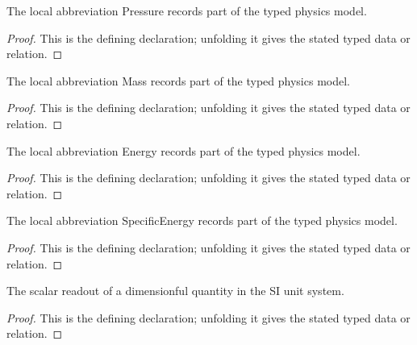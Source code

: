 \begin{definition}[Pressure]
  \label{decl:physics:IPhO_2026_4_B_6:Pressure}
  The local abbreviation Pressure records part of the typed physics model.
\end{definition}
\begin{proof}
  This is the defining declaration; unfolding it gives the stated typed data or relation.
\end{proof}

\begin{definition}[Mass]
  \label{decl:physics:IPhO_2026_4_B_6:Mass}
  The local abbreviation Mass records part of the typed physics model.
\end{definition}
\begin{proof}
  This is the defining declaration; unfolding it gives the stated typed data or relation.
\end{proof}

\begin{definition}[Energy]
  \label{decl:physics:IPhO_2026_4_B_6:Energy}
  The local abbreviation Energy records part of the typed physics model.
\end{definition}
\begin{proof}
  This is the defining declaration; unfolding it gives the stated typed data or relation.
\end{proof}

\begin{definition}[SpecificEnergy]
  \label{decl:physics:IPhO_2026_4_B_6:SpecificEnergy}
  The local abbreviation SpecificEnergy records part of the typed physics model.
\end{definition}
\begin{proof}
  This is the defining declaration; unfolding it gives the stated typed data or relation.
\end{proof}

\begin{definition}[siReadout]
  \label{decl:physics:IPhO_2026_4_B_6:siReadout}
  The scalar readout of a dimensionful quantity in the SI unit system.
\end{definition}
\begin{proof}
  This is the defining declaration; unfolding it gives the stated typed data or relation.
\end{proof}

